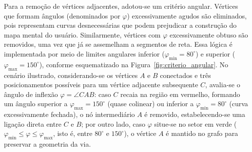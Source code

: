 \documentclass[cic,tc]{infufrgs}
\begin{document}
Para a remoção de vértices adjacentes, adotou-se um critério angular. Vértices que formam ângulos (denominados por $\varphi$) excessivamente agudos são eliminados, pois representam curvas desnecessárias que podem prejudicar a construção do mapa mental do usuário. Similarmente, vértices com $\varphi$ excessivamente obtuso são removidos, uma vez que já se assemelham a segmentos de reta. Essa lógica é implementada por meio de limites angulares inferior ($\varphi_{\min} = 80^\circ$) e superior ($\varphi_{\max} = 150^\circ$), conforme esquematizado na Figura~\ref{fig:criterio_angular}. No cenário ilustrado, considerando-se os vértices $A$ e $B$ conectados e três posicionamentos possíveis para um vértice adjacente subsequente $C$, avalia-se o ângulo de inflexão $\varphi = \angle CAB$: caso $C$ recaia na região em vermelho, formando um ângulo superior a $\varphi_{\max} = 150^\circ$ (quase colinear) ou inferior a $\varphi_{\min} = 80^\circ$ (curva excessivamente fechada), o nó intermediário $A$ é removido, estabelecendo-se uma ligação direta entre $C$ e $B$; por outro lado, caso $\varphi$ situe-se no setor em verde ($\varphi_{\min} \le \varphi \le \varphi_{\max}$, isto é, entre $80^\circ$ e $150^\circ$), o vértice $A$ é mantido no grafo para preservar a geometria da via.
\end{document}
